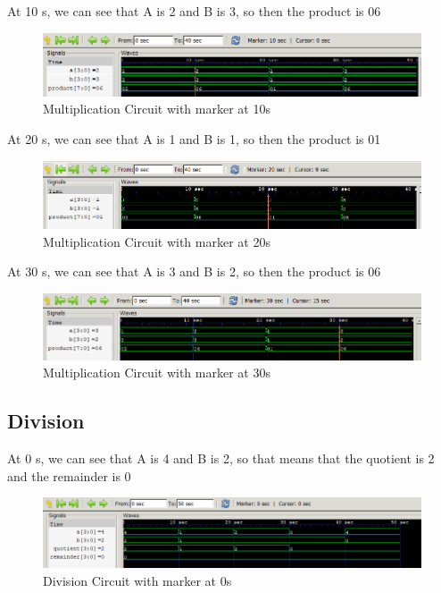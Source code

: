 \documentclass[12pt]{article}
\begin{document}
\newpage

At 10 s, we can see that A is 2 and B is 3, so then the product is 06
\begin{figure}[h]
    \centering
    \includegraphics[width = 1.0\textwidth]{figs/Mult10.png}
    \caption{Multiplication Circuit with marker at 10s}
    \label{fig:enter-label}
\end{figure}

At 20 s, we can see that A is 1 and B is 1, so then the product is 01
\begin{figure}[h]
    \centering
    \includegraphics[width = 1.0\textwidth]{figs/Mult20.png}
    \caption{Multiplication Circuit with marker at 20s}
    \label{fig:enter-label}
\end{figure}

At 30 s, we can see that A is 3 and B is 2, so then the product is 06
\begin{figure}[h]
    \centering
    \includegraphics[width = 1.0\textwidth]{figs/Mult30.png}
    \caption{Multiplication Circuit with marker at 30s}
    \label{fig:enter-label}
\end{figure}

\newpage

\subsection{Division}

At 0 s, we can see that A is 4 and B is 2, so that means that the quotient is 2 and the remainder is 0
\begin{figure}[h]
    \centering
    \includegraphics[width = 1.0\textwidth]{figs/Div0.png}
    \caption{Division Circuit with marker at 0s}
    \label{fig:enter-label}
\end{figure}
\end{document}

